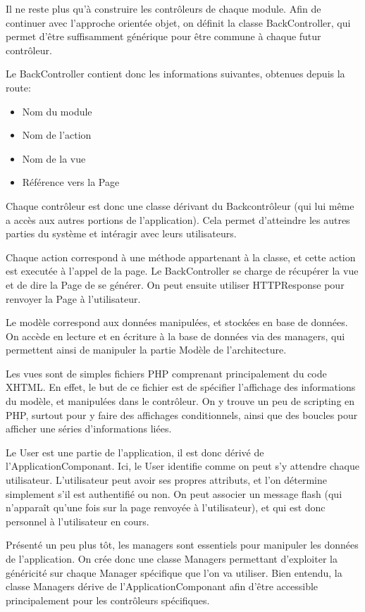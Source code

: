 Il ne reste plus qu'à construire les contrôleurs de chaque module.
Afin de continuer avec l'approche orientée objet, on définit la classe BackController, qui permet d'être
suffisamment générique pour être commune à chaque futur contrôleur.

Le BackController contient donc les informations suivantes, obtenues depuis la route:

    \begin{itemize}
    \item Nom du module
    \item Nom de l'action
    \item Nom de la vue
    \item Référence vers la Page
    \end{itemize}

Chaque contrôleur est donc une classe dérivant du Backcontrôleur (qui lui même a accès aux autres portions de l'application).
Cela permet d'atteindre les autres parties du système et intéragir avec leurs utilisateurs.

Chaque action correspond à une méthode appartenant à la classe, et cette action est executée à l'appel de la page.
Le BackController se charge de récupérer la vue et de dire la Page de se générer. On peut ensuite utiliser HTTPResponse pour
renvoyer la Page à l'utilisateur.

Le modèle correspond aux données manipulées, et stockées en base de données. On accède en lecture et en écriture à la base de données
via des managers, qui permettent ainsi de manipuler la partie Modèle de l'architecture.

Les vues sont de simples fichiers PHP comprenant principalement du code XHTML. En effet, le but de ce fichier est de spécifier
l'affichage des informations du modèle, et manipulées dans le contrôleur. On y trouve un peu de scripting en PHP, surtout
pour y faire des affichages conditionnels, ainsi que des boucles pour afficher une séries d'informations liées.

Le User est une partie de l'application, il est donc dérivé de l'ApplicationComponant. Ici, le User identifie comme on peut
s'y attendre chaque utilisateur. L'utilisateur peut avoir ses propres attributs, et l'on détermine simplement s'il est authentifié
ou non. On peut associer un message flash (qui n'apparaît qu'une fois sur la page renvoyée à l'utilisateur), et qui est donc personnel
à l'utilisateur en cours.

Présenté un peu plus tôt, les managers sont essentiels pour manipuler les données de l'application. On crée donc une classe
Managers permettant d'exploiter la généricité sur chaque Manager spécifique que l'on va utiliser. Bien entendu, la classe
Managers dérive de l'ApplicationComponant afin d'être accessible principalement pour les contrôleurs spécifiques.

